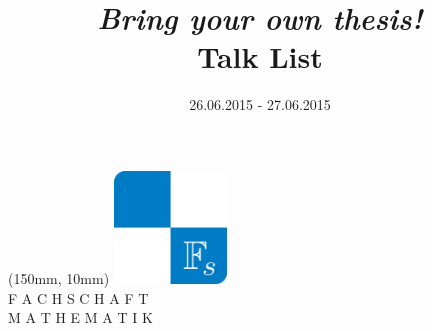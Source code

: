 \documentclass[12pt, a4paper, english]{article}
\title{\emph{Bring your own thesis!} \\ Talk List}
\date{26.06.2015 - 27.06.2015}
\begin{document}
\maketitle

\begin{textblock*}{50mm}(150mm, 10mm)
\includegraphics[width=30mm]{fs}\\
        \small
        F A C H S C H A F T\\
        M A T H E M A T I K
\end{textblock*}


\end{document}
